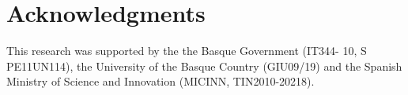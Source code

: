 \documentclass[11pt]{article}
\begin{document}
\section*{Acknowledgments}
This research was supported by the the Basque Government (IT344-
10, S PE11UN114), the University of the
Basque Country (GIU09/19) and the Spanish
Ministry of Science and Innovation (MICINN,
TIN2010-20218).
%
%




{}
\end{document}
